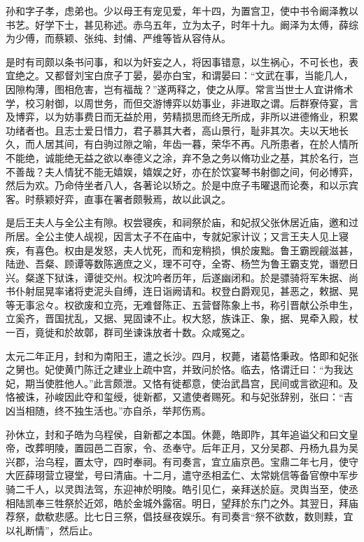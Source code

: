 \documentclass[12pt,UTF8]{ctexbook}
\begin{document}
孙和字子孝，虑弟也。少以母王有宠见爱，年十四，为置宫卫，使中书令阚泽教以书艺。好学下士，甚见称述。赤乌五年，立为太子，时年十九。阚泽为太傅，薛综为少傅，而蔡颖、张纯、封俌、严维等皆从容侍从。

是时有司颇以条书问事，和以为奸妄之人，将因事错意，以生祸心，不可长也，表宜绝之。又都督刘宝白庶子丁晏，晏亦白宝，和谓晏曰：“文武在事，当能几人，因隙构薄，图相危害，岂有福哉？”遂两释之，使之从厚。常言当世士人宜讲脩术学，校习射御，以周世务，而但交游博弈以妨事业，非进取之谓。后群寮侍宴，言及博弈，以为妨事费日而无益於用，劳精损思而终无所成，非所以进德脩业，积累功绪者也。且志士爱日惜力，君子慕其大者，高山景行，耻非其次。夫以天地长久，而人居其间，有白驹过隙之喻，年齿一暮，荣华不再。凡所患者，在於人情所不能绝，诚能绝无益之欲以奉德义之涂，弃不急之务以脩功业之基，其於名行，岂不善哉？夫人情犹不能无嬉娱，嬉娱之好，亦在於饮宴琴书射御之间，何必博弈，然后为欢。乃命侍坐者八人，各著论以矫之。於是中庶子韦曜退而论奏，和以示宾客。时蔡颖好弈，直事在署者颇斅焉，故以此讽之。

是后王夫人与全公主有隙。权尝寝疾，和祠祭於庙，和妃叔父张休居近庙，邀和过所居。全公主使人觇视，因言太子不在庙中，专就妃家计议；又言王夫人见上寝疾，有喜色。权由是发怒，夫人忧死，而和宠稍损，惧於废黜。鲁王霸觊觎滋甚，陆逊、吾粲、顾谭等数陈適庶之义，理不可夺，全寄、杨竺为鲁王霸支党，谮愬日兴。粲遂下狱诛，谭徙交州。权沈吟者历年，后遂幽闭和。於是骠骑将军朱据、尚书仆射屈晃率诸将吏泥头自缚，连日诣阙请和。权登白爵观见，甚恶之，敕据、晃等无事忩々。权欲废和立亮，无难督陈正、五营督陈象上书，称引晋献公杀申生，立奚齐，晋国扰乱，又据、晃固谏不止。权大怒，族诛正、象，据、晃牵入殿，杖一百，竟徙和於故鄣，群司坐谏诛放者十数。众咸冤之。

太元二年正月，封和为南阳王，遣之长沙。四月，权薨，诸葛恪秉政。恪即和妃张之舅也。妃使黄门陈迁之建业上疏中宫，并致问於恪。临去，恪谓迁曰：“为我达妃，期当使胜他人。”此言颇泄。又恪有徙都意，使治武昌宫，民间或言欲迎和。及恪被诛，孙峻因此夺和玺绶，徙新都，又遣使者赐死。和与妃张辞别，张曰：“吉凶当相随，终不独生活也。”亦自杀，举邦伤焉。

孙休立，封和子皓为乌程侯，自新都之本国。休薨，皓即阼，其年追谥父和曰文皇帝，改葬明陵，置园邑二百家，令、丞奉守。后年正月，又分吴郡、丹杨九县为吴兴郡，治乌程，置太守，四时奉祠。有司奏言，宜立庙京邑。宝鼎二年七月，使守大匠薛珝营立寝堂，号曰清庙。十二月，遣守丞相孟仁、太常姚信等备官僚中军步骑二千人，以灵舆法驾，东迎神於明陵。皓引见仁，亲拜送於庭。灵舆当至，使丞相陆凯奉三牲祭於近郊，皓於金城外露宿。明日，望拜於东门之外。其翌日，拜庙荐祭，歔欷悲感。比七日三祭，倡技昼夜娱乐。有司奏言“祭不欲数，数则黩，宜以礼断情”，然后止。
\end{document}
